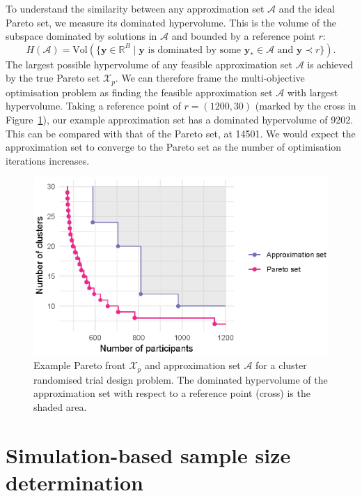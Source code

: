 \documentclass[sagev, doublespace, Crown]{sagej}
\begin{document}
To understand the similarity between any approximation set $\mathcal{A}$ and the ideal Pareto set, we measure its dominated hypervolume. This is the volume of the subspace dominated by solutions in $\mathcal{A}$ and bounded by a reference point $r$:
\begin{equation}
H(\mathcal{A}) = \text{Vol}(\{\mathbf{y} \in \mathbb{R}^{B} \mid \mathbf{y} \text{ is dominated by some } \mathbf{y}_{*} \in \mathcal{A} \text{ and } \mathbf{y} \prec r \}). 
\end{equation}
The largest possible hypervolume of any feasible approximation set $\mathcal{A}$ is achieved by the true Pareto set $\mathcal{X}_{p}$. We can therefore frame the multi-objective optimisation problem as finding the feasible approximation set $\mathcal{A}$ with largest hypervolume. Taking a reference point of $r = (1200, 30)$ (marked by the cross in Figure~\ref{fig:fake_pareto}), our example approximation set has a dominated hypervolume of 9202. This can be compared with that of the Pareto set, at 14501. We would expect the approximation set to converge to the Pareto set as the number of optimisation iterations increases.

\begin{figure}
\centering
\includegraphics[scale=0.8]{fig2_fake_pareto.eps}
\caption{Example Pareto front $\mathcal{X}_{p}$ and approximation set $\mathcal{A}$ for a cluster randomised trial design problem. The dominated hypervolume of the approximation set with respect to a reference point (cross) is the shaded area.}
\label{fig:fake_pareto}
\end{figure}


\section{Simulation-based sample size determination}\label{sec:methods}
\end{document}
